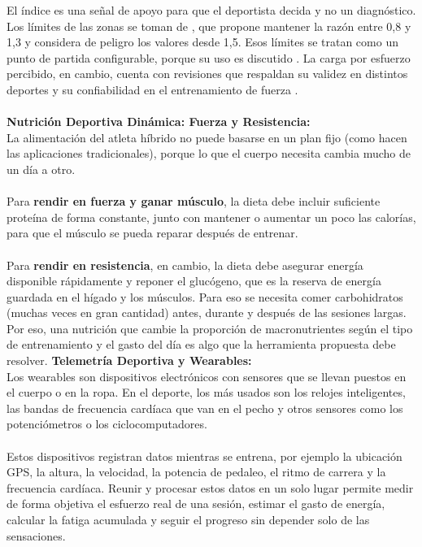 El índice es una señal de apoyo para que el deportista decida y no un diagnóstico. Los límites de las zonas se toman de \citet{gabbett2016training}, que propone mantener la razón entre 0,8 y 1,3 y considera de peligro los valores desde 1,5. Esos límites se tratan como un punto de partida configurable, porque su uso es discutido \citep{impellizzeri2020acute}. La carga por esfuerzo percibido, en cambio, cuenta con revisiones que respaldan su validez en distintos deportes \citep{haddad2017session} y su confiabilidad en el entrenamiento de fuerza \citep{day2004monitoring}.
\\\\
\textbf{Nutrición Deportiva Dinámica: Fuerza y Resistencia:}\\
La alimentación del atleta híbrido no puede basarse en un plan fijo (como hacen las aplicaciones tradicionales), porque lo que el cuerpo necesita cambia mucho de un día a otro.
\\\\
Para \textbf{rendir en fuerza y ganar músculo}, la dieta debe incluir suficiente proteína de forma constante, junto con mantener o aumentar un poco las calorías, para que el músculo se pueda reparar después de entrenar.
\\\\
Para \textbf{rendir en resistencia}, en cambio, la dieta debe asegurar energía disponible rápidamente y reponer el glucógeno, que es la reserva de energía guardada en el hígado y los músculos. Para eso se necesita comer carbohidratos (muchas veces en gran cantidad) antes, durante y después de las sesiones largas. Por eso, una nutrición que cambie la proporción de macronutrientes según el tipo de entrenamiento y el gasto del día es algo que la herramienta propuesta debe resolver.
\textbf{Telemetría Deportiva y Wearables:}\\
Los wearables son dispositivos electrónicos con sensores que se llevan puestos en el cuerpo o en la ropa. En el deporte, los más usados son los relojes inteligentes, las bandas de frecuencia cardíaca que van en el pecho y otros sensores como los potenciómetros o los ciclocomputadores.
\\\\
Estos dispositivos registran datos mientras se entrena, por ejemplo la ubicación GPS, la altura, la velocidad, la potencia de pedaleo, el ritmo de carrera y la frecuencia cardíaca. Reunir y procesar estos datos en un solo lugar permite medir de forma objetiva el esfuerzo real de una sesión, estimar el gasto de energía, calcular la fatiga acumulada y seguir el progreso sin depender solo de las sensaciones.
